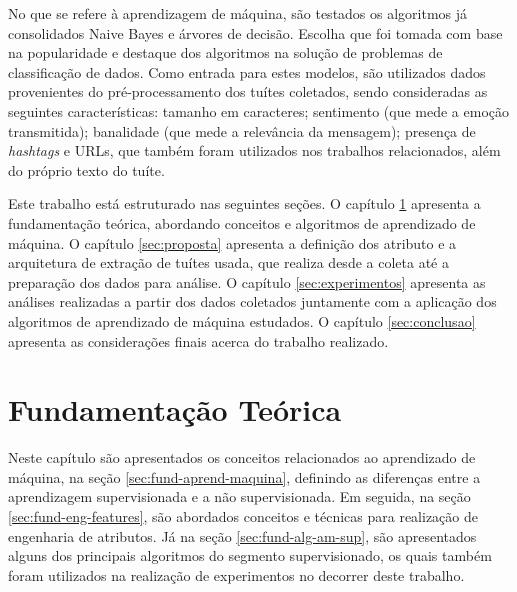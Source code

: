 \documentclass[oneside,openright,12pt]{ufsm_2015} %
\begin{document}
{    \par No que se refere à aprendizagem de máquina, são testados os algoritmos já consolidados Naive Bayes e árvores de decisão. Escolha que foi tomada com base na popularidade e destaque dos algoritmos na solução de problemas de classificação de dados. Como entrada para estes modelos, são utilizados dados provenientes do pré-processamento dos tuítes coletados, sendo consideradas as seguintes características: tamanho em caracteres; sentimento (que mede a emoção transmitida); banalidade (que mede a relevância da mensagem); presença de \textit{hashtags} e URLs, que também foram utilizados nos trabalhos relacionados, além do próprio texto do tuíte.

    \par Este trabalho está estruturado nas seguintes seções. O capítulo \ref{sec:fund-teorica} apresenta a fundamentação teórica, abordando conceitos e algoritmos de aprendizado de máquina. O capítulo \ref{sec:proposta} apresenta a definição dos atributo e a arquitetura de extração de tuítes usada, que realiza desde a coleta até a preparação dos dados para análise. O capítulo \ref{sec:experimentos} apresenta as análises realizadas a partir dos dados coletados juntamente com a aplicação dos algoritmos de aprendizado de máquina estudados. O capítulo \ref{sec:conclusao} apresenta as considerações finais acerca do trabalho realizado.


}
\geraintro  %


\chapter{Fundamentação Teórica}
\label{sec:fund-teorica}

    \par Neste capítulo são apresentados os conceitos relacionados ao aprendizado de máquina, na seção \ref{sec:fund-aprend-maquina}, definindo as diferenças entre a aprendizagem supervisionada e a não supervisionada. Em seguida, na seção \ref{sec:fund-eng-features}, são abordados conceitos e técnicas para realização de engenharia de atributos. Já na seção \ref{sec:fund-alg-am-sup}, são apresentados alguns dos principais algoritmos do segmento supervisionado, os quais também foram utilizados na realização de experimentos no decorrer deste trabalho.
\end{document}
